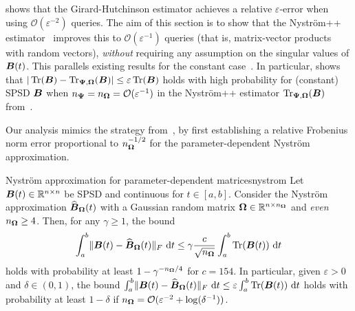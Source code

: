  shows that the Girard-Hutchinson estimator achieves a relative $\varepsilon$-error when using $\mathcal{O}(\varepsilon^{-2})$ queries. The aim of this section is to show that the Nyström++ estimator~ improves this to $\mathcal{O}(\varepsilon^{-1})$ queries (that is, matrix-vector products with random vectors), \emph{without} requiring any assumption on the singular values of $\boldsymbol{B}(t)$. This parallels existing results for the constant case~\cite{meyer-2021-hutch-optimal,persson-2022-improved-variants}. In particular, \cite[Theorem 3.4]{persson-2022-improved-variants} shows that $|\operatorname{Tr}(\boldsymbol{B}) - \operatorname{Tr}_{\boldsymbol{\Psi}, \boldsymbol{\Omega}}(\boldsymbol{B})| \leq \varepsilon \operatorname{Tr}(\boldsymbol{B})$ holds with high probability for (constant) SPSD $\boldsymbol{B}$ when $n_{\boldsymbol{\Psi}} = n_{\boldsymbol{\Omega}} = \mathcal{O}(\varepsilon^{-1})$ in the Nyström++ estimator $\operatorname{Tr}_{\boldsymbol{\Psi}, \boldsymbol{\Omega}}(\boldsymbol{B})$ from~. 

Our analysis mimics the strategy from~\cite{meyer-2021-hutch-optimal}, by first establishing a relative Frobenius norm error proportional to $n_{\boldsymbol{\Omega}}^{-1/2}$ for the parameter-dependent Nyström approximation.


\begin{lemma}{Nyström approximation for parameter-dependent matrices}{nystrom}
    Let $\boldsymbol{B}(t) \in \mathbb{R}^{n \times n}$ be SPSD and continuous for $t \in [a, b]$. Consider the Nyström approximation $\widehat{\boldsymbol{B}}_{\boldsymbol{\Omega}}(t)$ with a Gaussian random matrix $\boldsymbol{\Omega} \in \mathbb{R}^{n \times n_{\boldsymbol{\Omega}}}$ and \emph{even} $n_{\boldsymbol{\Omega}} \geq 4$.
    Then, for any $\gamma \geq 1$, the bound
    \begin{equation}
        \int_{a}^{b} \lVert \boldsymbol{B}(t) - \widehat{\boldsymbol{B}}_{\boldsymbol{\Omega}}(t) \rVert _F~\mathrm{d}t \leq \gamma \frac{c}{\sqrt{n_{\boldsymbol{\Omega}}}} \int_{a}^{b} \operatorname{Tr}(\boldsymbol{B}(t))~\mathrm{d}t
        \label{equ:nystrompp-theorem-bound}
    \end{equation}
        holds with probability at least $1 - \gamma^{-n_{\boldsymbol{\Omega}} / 4}$ for 
        $c = 154$. In particular, given $\varepsilon > 0$ and $\delta \in (0, 1)$, the bound $\int_{a}^{b} \lVert \boldsymbol{B}(t) - \widehat{\boldsymbol{B}}_{\boldsymbol{\Omega}}(t) \rVert _F~\mathrm{d}t \leq \varepsilon \int_{a}^{b} \operatorname{Tr}(\boldsymbol{B}(t))~\mathrm{d}t$ holds with probability at least $1-\delta$ if $n_{\boldsymbol{\Omega}} = \mathcal{O}(\varepsilon^{-2} + \log(\delta^{-1}))$.
\end{lemma}

